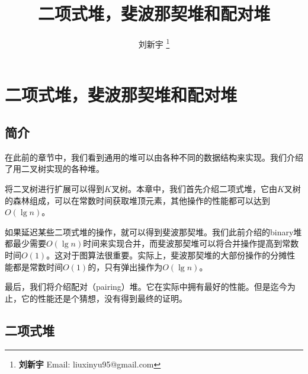 \documentclass[UTF8]{article}
\begin{document}


\title{二项式堆，斐波那契堆和配对堆}

\author{刘新宇
\thanks{{\bfseries 刘新宇 } \newline
  Email: liuxinyu95@gmail.com \newline}
  }

\maketitle
\fi


\ifx\wholebook\relax
\chapter{二项式堆，斐波那契堆和配对堆}
\fi

\section{简介}
\label{introduction}

在此前的章节中，我们看到通用的堆可以由各种不同的数据结构来实现。我们介绍了用二叉树实现的各种堆。

将二叉树进行扩展可以得到$K$叉树\cite{K-ary-tree}。本章中，我们首先介绍二项式堆，它由$K$叉树的森林组成，可以在常数时间获取堆顶元素，其他操作的性能都可以达到$O(\lg n)$。

如果延迟某些二项式堆的操作，就可以得到斐波那契堆。我们此前介绍的binary堆都最少需要$O(\lg n)$时间来实现合并，而斐波那契堆可以将合并操作提高到常数时间$O(1)$。这对于图算法很重要。实际上，斐波那契堆的大部份操作的分摊性能都是常数时间$O(1)$的，只有弹出操作为$O(\lg n)$。

最后，我们将介绍配对（pairing）堆。它在实际中拥有最好的性能。但是迄今为止，它的性能还是个猜想，没有得到最终的证明。


\section{二项式堆}
\label{binomail-heap} 
\end{document}
